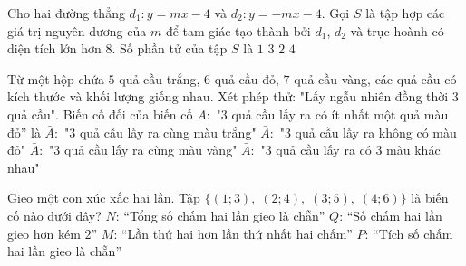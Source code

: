 \begin{ex}%
	Cho hai đường  thẳng $d_1 \colon y=mx-4$ và $d_2 \colon y=-mx-4$. Gọi $S$ là tập hợp các giá trị nguyên dương của $m$ để tam giác tạo thành bởi $d_1$, $d_2$ và trục hoành có diện tích lớn hơn $8$. Số phần tử của tập $S$ là
	 \choice
		{\True $1$} 
		 {$3$}
		 {$2$}
		{$4$} 
\end{ex}

\begin{ex}%
	Từ một hộp chứa $5$ quả cầu trắng, $6$ quả cầu đỏ, $7$ quả cầu vàng, các quả cầu có kích thước và khối lượng giống nhau. Xét phép thử: "Lấy ngẫu nhiên đồng thời $3$ quả cầu". Biến cố đối của biến cố $A\colon$ "$3$ quả cầu lấy ra có ít nhất một quả màu đỏ”  là
	\choice 
		{$\bar{A}\colon$ "3 quả  cầu lấy ra cùng màu trắng"}
		{\True $\bar{A}\colon$ "3 quả cầu lấy ra  không có màu đỏ"}
		{$\bar{A}\colon$ "3 quả  cầu lấy ra cùng màu vàng"}
		{$\bar{A}\colon$ "3 quả cầu lấy ra có  3 màu khác nhau"}
\end{ex}

\begin{ex}%
	Gieo một con xúc xắc hai lần.  Tập $\big\{(1;3),\;(2;4),\;(3;5),\;(4;6)\big\}$ là biến cố nào dưới đây?
	\choice 
		{$N$:  ``Tổng số chấm hai lần gieo là chẵn''}
		{$Q$: ``Số chấm  hai lần gieo hơn kém $2$''}
		{\True $M$: ``Lần thứ hai hơn lần  thứ nhất hai chấm''}
		{$P$: ``Tích số  chấm hai lần gieo là chẵn''}
\end{ex}


